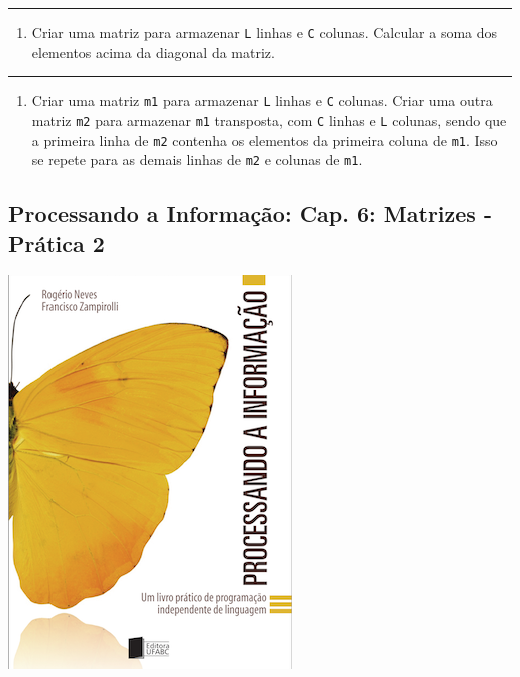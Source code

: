 \documentclass[12pt,a4paper]{article}
\providecommand{\tightlist}{%
      \setlength{\itemsep}{0pt}\setlength{\parskip}{0pt}}
\begin{document}
    \begin{center}\rule{0.5\linewidth}{0.5pt}\end{center}

\begin{enumerate}
\def\labelenumi{\arabic{enumi}.}
\setcounter{enumi}{3}
\tightlist
\item
  Criar uma matriz para armazenar \texttt{L} linhas e \texttt{C}
  colunas. Calcular a soma dos elementos acima da diagonal da matriz.
\end{enumerate}

    \begin{center}\rule{0.5\linewidth}{0.5pt}\end{center}

\begin{enumerate}
\def\labelenumi{\arabic{enumi}.}
\setcounter{enumi}{4}
\tightlist
\item
  Criar uma matriz \texttt{m1} para armazenar \texttt{L} linhas e
  \texttt{C} colunas. Criar uma outra matriz \texttt{m2} para armazenar
  \texttt{m1} transposta, com \texttt{C} linhas e \texttt{L} colunas,
  sendo que a primeira linha de \texttt{m2} contenha os elementos da
  primeira coluna de \texttt{m1}. Isso se repete para as demais linhas
  de \texttt{m2} e colunas de \texttt{m1}.
\end{enumerate}

    \hypertarget{processando-a-informauxe7uxe3o-cap.-6-matrizes---pruxe1tica-2}{%
\subsection{Processando a Informação: Cap. 6: Matrizes - Prática
2}\label{processando-a-informauxe7uxe3o-cap.-6-matrizes---pruxe1tica-2}}

    \includegraphics{"figs/Capa_Processando_Informacao.jpg"}
\end{document}
